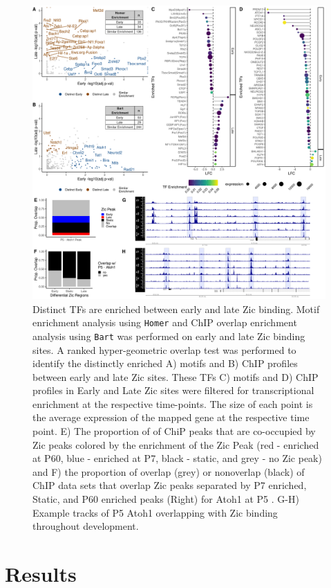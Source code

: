 \documentclass[fleqn,10pt]{wlscirep}
\begin{document}
\begin{figure}[!ht]
\centering
\includegraphics[width=.95\textwidth]{../figures/figure2.png}
\caption{ Distinct TFs are enriched between early and late Zic binding. Motif enrichment analysis using \texttt{Homer} and ChIP overlap enrichment analysis using \texttt{Bart} was performed on early and late Zic binding sites. A ranked hyper-geometric overlap test was performed to identify the distinctly enriched A) motifs and B) ChIP profiles between early and late Zic sites. These TFs C) motifs and D) ChIP profiles in Early and Late Zic sites were filtered for transcriptional enrichment at the respective time-points. The size of each point is the average expression of the mapped gene at the respective time point. E) The proportion of of ChiP peaks that are co-occupied by Zic peaks colored by the enrichment of the Zic Peak (red - enriched at P60, blue - enriched at P7, black - static, and grey - no Zic peak) and F) the proportion of overlap (grey) or nonoverlap (black) of ChIP data sets that overlap Zic peaks separated by P7 enriched, Static, and P60 enriched peaks (Right) for Atoh1 at P5 \cite{Klisch2011InDevelopment}. G-H) Example tracks of P5 Atoh1 overlapping with Zic binding throughout development. }
\label{fig:DistinctTFs}
\end{figure}

\section*{Results}
\end{document}
